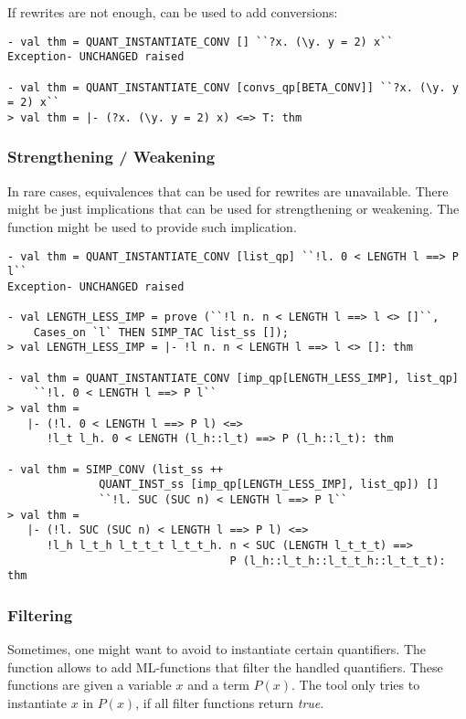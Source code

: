 If rewrites are not enough,  can be used to add conversions:
\begin{session}
\begin{verbatim}
- val thm = QUANT_INSTANTIATE_CONV [] ``?x. (\y. y = 2) x``
Exception- UNCHANGED raised

- val thm = QUANT_INSTANTIATE_CONV [convs_qp[BETA_CONV]] ``?x. (\y. y = 2) x``
> val thm = |- (?x. (\y. y = 2) x) <=> T: thm
\end{verbatim}
\end{session}

\subsubsection{Strengthening / Weakening}

In rare cases, equivalences that can be used for rewrites are unavailable. There might be just implications that
can be used for strengthening or weakening. The function
 might be used to provide such implication.

\begin{session}
\begin{verbatim}
- val thm = QUANT_INSTANTIATE_CONV [list_qp] ``!l. 0 < LENGTH l ==> P l``
Exception- UNCHANGED raised

- val LENGTH_LESS_IMP = prove (``!l n. n < LENGTH l ==> l <> []``,
    Cases_on `l` THEN SIMP_TAC list_ss []);
> val LENGTH_LESS_IMP = |- !l n. n < LENGTH l ==> l <> []: thm

- val thm = QUANT_INSTANTIATE_CONV [imp_qp[LENGTH_LESS_IMP], list_qp]
    ``!l. 0 < LENGTH l ==> P l``
> val thm =
   |- (!l. 0 < LENGTH l ==> P l) <=>
      !l_t l_h. 0 < LENGTH (l_h::l_t) ==> P (l_h::l_t): thm

- val thm = SIMP_CONV (list_ss ++
              QUANT_INST_ss [imp_qp[LENGTH_LESS_IMP], list_qp]) []
              ``!l. SUC (SUC n) < LENGTH l ==> P l``
> val thm =
   |- (!l. SUC (SUC n) < LENGTH l ==> P l) <=>
      !l_h l_t_h l_t_t_t l_t_t_h. n < SUC (LENGTH l_t_t_t) ==>
                                  P (l_h::l_t_h::l_t_t_h::l_t_t_t): thm
\end{verbatim}
\end{session}


\subsubsection{Filtering}
Sometimes, one might want to avoid to instantiate certain quantifiers.
The function  allows to add ML-functions that filter the handled
quantifiers. These functions are given a variable $x$ and a term $P(x)$.
The tool only tries to instantiate $x$ in $P(x)$, if all filter functions
return \textit{true}.

